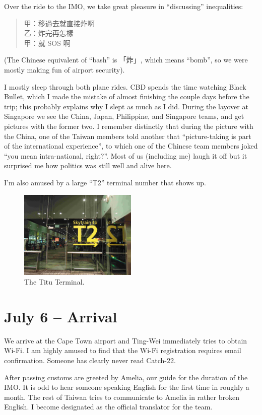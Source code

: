 \documentclass[11pt]{scrreprt}
\numberwithin{figure}{chapter}
\begin{document}
Over the ride to the IMO, we take great pleasure in ``discussing'' inequalities:
\begin{quote}
  甲：移過去就直接炸啊 \\
  乙：炸完再怎樣 \\
  甲：就 SOS 啊
\end{quote}
(The Chinese equivalent of ``bash'' is 「炸」, which means ``bomb'', so we were mostly making fun of airport security).

I mostly sleep through both plane rides. CBD spends the time watching Black Bullet, which I made the mistake of almost
finishing the couple days before the trip; this probably explains why I slept as much as I did.
During the layover at Singapore we see the China, Japan, Philippine, and Singapore teams, and get pictures with
the former two. I remember distinctly that during the picture with the China, one of the Taiwan members told another that
``picture-taking is part of the international experience'', to which one of the Chinese team members joked ``you mean
intra-national, right?''. Most of us (including me) laugh it off but it surprised me how politics was still well
and alive here.

I'm also amused by a large ``T2'' terminal number that shows up.

\begin{figure}[ht]
  \centering
  \includegraphics[width=0.5\textwidth]{media/T2.jpg}
  \caption{The Titu Terminal.}
\end{figure}


\section{July 6 -- Arrival}
We arrive at the Cape Town airport and Ting-Wei immediately tries to obtain Wi-Fi.
I am highly amused to find that the Wi-Fi registration requires email confirmation.
Someone has clearly never read Catch-22.

After passing customs are greeted by Amelia, our guide for the duration of the IMO.
It is odd to hear someone speaking English for the first time in roughly a month.
The rest of Taiwan tries to communicate to Amelia in rather broken English.
I become designated as the official translator for the team.
\end{document}
